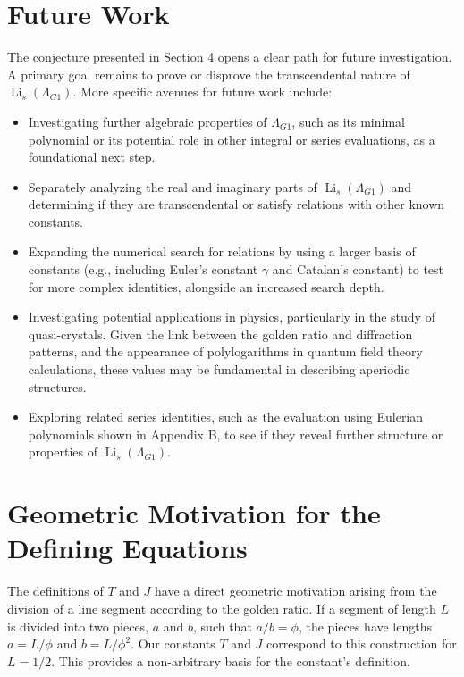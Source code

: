 \documentclass{amsart}
\theoremstyle{plain}
\theoremstyle{definition}
\theoremstyle{remark}
\DeclareMathOperator{\Li}{Li} %
\newcommand{\LambdaG}{\Lambda_{G1}}
\newcommand{\phiG}{\phi}
\begin{document}
\section{Future Work}
The conjecture presented in Section 4 opens a clear path for future investigation. A primary goal remains to prove or disprove the transcendental nature of $\Li_s(\LambdaG)$. More specific avenues for future work include:
\begin{itemize}
    \item Investigating further algebraic properties of $\LambdaG$, such as its minimal polynomial or its potential role in other integral or series evaluations, as a foundational next step.
    \item Separately analyzing the real and imaginary parts of $\Li_s(\LambdaG)$ and determining if they are transcendental or satisfy relations with other known constants.
    \item Expanding the numerical search for relations by using a larger basis of constants (e.g., including Euler's constant $\gamma$ and Catalan's constant) to test for more complex identities, alongside an increased search depth.
    \item Investigating potential applications in physics, particularly in the study of quasi-crystals. Given the link between the golden ratio and diffraction patterns, and the appearance of polylogarithms in quantum field theory calculations, these values may be fundamental in describing aperiodic structures.
    \item Exploring related series identities, such as the evaluation using Eulerian polynomials shown in Appendix B, to see if they reveal further structure or properties of $\Li_s(\LambdaG)$.
\end{itemize}

\appendix
\section{Geometric Motivation for the Defining Equations}
The definitions of $T$ and $J$ have a direct geometric motivation arising from the division of a line segment according to the golden ratio. If a segment of length $L$ is divided into two pieces, $a$ and $b$, such that $a/b = \phiG$, the pieces have lengths $a=L/\phiG$ and $b=L/\phiG^2$. Our constants $T$ and $J$ correspond to this construction for $L=1/2$. This provides a non-arbitrary basis for the constant's definition.
\end{document}
